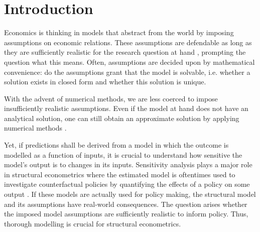 \section{Introduction} \label{intro}


Economics is thinking in models that abstract from the world by imposing assumptions on economic relations. These assumptions are defendable as long as they are sufficiently realistic for the research question at hand \citep{F53}, prompting the question what this means. Often, assumptions are decided upon by mathematical convenience: do the assumptions grant that the model is solvable, i.e. whether a solution exists in closed form and whether this solution is unique.



With the advent of numerical methods, we are less coerced to impose insufficiently realistic assumptions. Even if the model at hand does not have an analytical solution, one can still obtain an approximate solution by applying numerical methods \citep{MF04}.


Yet, if predictions shall be derived from a model in which the outcome is modelled as a function of inputs, it is crucial to understand how sensitive the model’s output is to changes in its inputs. Sensitivity analysis plays a major role in structural econometrics where the estimated model is oftentimes used to investigate counterfactual policies by quantifying the effects of a policy on some output \citep{LM17}. If these models are actually used for policy making, the structural model and its assumptions have real-world consequences. The question arises whether the imposed model assumptions are sufficiently realistic to inform policy. Thus, thorough modelling is crucial for structural econometrics.


